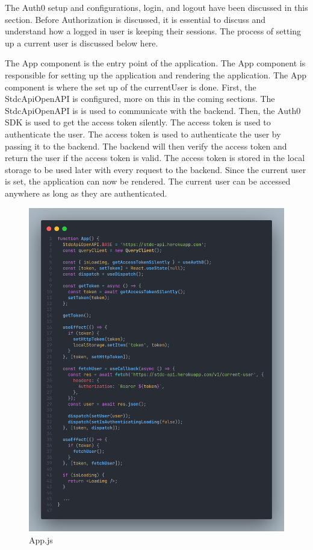 \begin{justify}
        \clearpage
        \newendline The Auth0 setup and configurations, login, and logout have been discussed in this section. Before Authorization is discussed, it is essential to discuss and understand how a logged in user is keeping their sessions. The process of setting up a current user is discussed below here.

        \vspace{0.25cm}
        \newendline The App component is the entry point of the application. The App component is responsible for setting up the application and rendering the application. The App component is where the set up of the currentUser is done.
        First, the StdcApiOpenAPI is configured, more on this in the coming sections. The StdcApiOpenAPI is is used to communicate with the backend.
        Then, the Auth0 SDK is used to get the access token silently. The access token is used to authenticate the user. The access token is used to authenticate the user by passing it to the backend. The backend will then verify the access token and return the user if the access token is valid. The access token is stored in the local storage to be used later with every request to the backend.
        Since the current user is set, the application can now be rendered. The current user can be accessed anywhere as long as they are authenticated.

        \begin{figure}[H]
            \centerline{\includegraphics[width=150mm,scale=1]{figures/implementation_and_testing/implementation/frontend/app.png}}
            \caption{App.js}
        \end{figure}
        


\end{justify}
